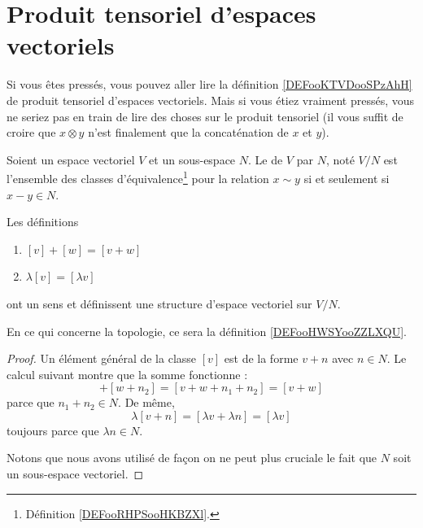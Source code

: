 

\section{Produit tensoriel d'espaces vectoriels}

Si vous êtes pressés, vous pouvez aller lire la définition \ref{DEFooKTVDooSPzAhH} de produit tensoriel d'espaces vectoriels. Mais si vous étiez vraiment pressés, vous ne seriez pas en train de lire des choses sur le produit tensoriel (il vous suffit de croire que \( x\otimes y\) n'est finalement que la concaténation de \( x\) et \( y\)).

\begin{propositionDef}      \label{PROPooYONEooWvwPZT}
	Soient un espace vectoriel \( V\) et un sous-espace \( N\). Le  de \( V\) par \( N\), noté \( V/N\) est l'ensemble des classes d'équivalence\footnote{Définition \ref{DEFooRHPSooHKBZXl}.} pour la relation \( x\sim y\) si et seulement si \( x-y\in N\).

	Les définitions
	\begin{enumerate}
		\item
		      \( [v]+[w]=[v+w]\)
		\item
		      \( \lambda[v]=[\lambda v]\)
	\end{enumerate}
	ont un sens et définissent une structure d'espace vectoriel sur \( V/N\).

	En ce qui concerne la topologie, ce sera la définition \ref{DEFooHWSYooZZLXQU}.
\end{propositionDef}

\begin{proof}
	Un élément général de la classe \( [v]\) est de la forme \( v+n\) avec \( n\in N\). Le calcul suivant montre que la somme fonctionne :
	\begin{equation}
		[v+n_1]+[w+n_2]=[v+w+n_1+n_2]=[v+w]
	\end{equation}
	parce que \( n_1+n_2\in N\). De même,
	\begin{equation}
		\lambda[v+n]=[\lambda v+\lambda n]=[\lambda v]
	\end{equation}
	toujours parce que \( \lambda n\in N\).

	Notons que nous avons utilisé de façon on ne peut plus cruciale le fait que \( N\) soit un sous-espace vectoriel.
\end{proof}

